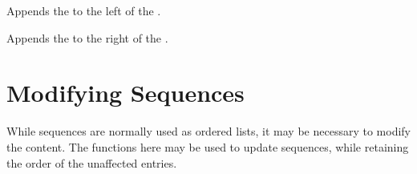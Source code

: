 \documentclass[oneside]{book}
\begin{document}

\begin{function}{\seqPutLeft}
\begin{syntax}
  
\end{syntax}
Appends the  to the left of the .
\begin{demohigh}
\seqSetFromClist {}
\seqPutLeft {}
\seqVarJoin {}
\end{demohigh}
\end{function}

\begin{function}{\seqPutRight}
\begin{syntax}
  
\end{syntax}
Appends the  to the right of the .
\begin{demohigh}
\seqSetFromClist {}
\seqPutRight {}
\seqVarJoin {}
\end{demohigh}
\end{function}

\section{Modifying Sequences}

While sequences are normally used as ordered lists, it may be
necessary to modify the content. The functions here may be used
to update sequences, while retaining the order of the unaffected
entries.
\end{document}
